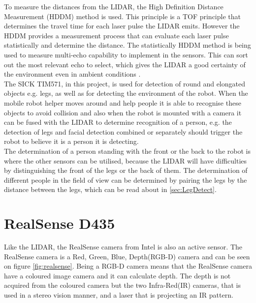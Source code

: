 To measure the distances from the LIDAR, the High Definition Distance Measurement (HDDM) method is used. This principle is a TOF principle that determines the travel time for each laser pulse the LIDAR emits. However the HDDM provides a measurement process that can evaluate each laser pulse statistically and determine the distance.
The statistically HDDM method is being used to measure multi-echo capability to implement in the sensors. This can sort out the most relevant echo to select, which gives the LIDAR a good certainty of the environment even in ambient conditions \cite{HDDM}.\\
The SICK TIM571, in this project, is used for detection of round and elongated objects e.g. legs, as well as for detecting the environment of the robot. When the mobile robot helper moves around and help people it is able to recognise these objects to avoid collision and also when the robot is mounted with a camera it can be fused with the LIDAR to determine recognition of a person, e.g. the detection of legs and facial detection combined or separately should trigger the robot to believe it is a person it is detecting.\\

The determination of a person standing with the front or the back to the robot is where the other sensors can be utilised, because the LIDAR will have difficulties by distinguishing the front of the legs or the back of them. The determination of different people in the field of view can be determined by pairing the legs by the distance between the legs, which can be read about in \ref{sec:LegDetect}.

\section{RealSense D435}

Like the LIDAR, the RealSense camera from Intel is also an active sensor. The RealSense camera is a Red, Green, Blue, Depth(RGB-D) camera and can be seen on figure \ref{fig:realsense}. Being a RGB-D camera means that the RealSense camera have a coloured image camera and it can calculate depth. The depth is not acquired from the coloured camera but the two Infra-Red(IR) cameras, that is used in a stereo vision manner, and a laser that is projecting an IR pattern.\cite{RealSense}\\

